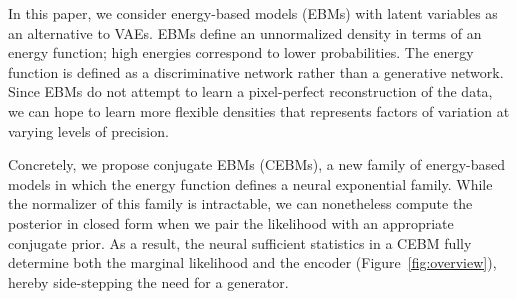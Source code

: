 \documentclass{article}
\begin{document}
In this paper, we consider energy-based models (EBMs) with latent variables as an alternative to VAEs. EBMs define an unnormalized density in terms of an energy function; high energies correspond to lower probabilities. The energy function is defined as a discriminative network rather than a generative network. Since EBMs do not attempt to learn a pixel-perfect reconstruction of the data, we can hope to learn more flexible densities that represents factors of variation at varying levels of precision.




Concretely, we propose conjugate EBMs (CEBMs), a new family of energy-based models in which the energy function defines a neural exponential family. While the normalizer of this family is intractable, we can nonetheless compute the posterior in closed form when we pair the likelihood with an appropriate conjugate prior. As a result, the neural sufficient statistics in a CEBM fully determine both the marginal likelihood and the encoder (Figure~\ref{fig:overview}), hereby side-stepping the need for a generator.
\end{document}
